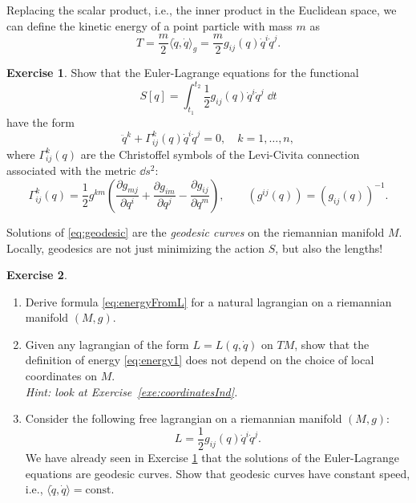 \documentclass[english,fontsize=11pt,paper=b5]{scrbook}
\theoremstyle{definition}
\newtheorem{exercise}{Exercise}[chapter]
\begin{document}
    Replacing the scalar product, i.e., the inner product in the Euclidean space, we can define the kinetic energy of a point particle with mass $m$ as
    \begin{equation}
      T = \frac m2 \langle\dot q, \dot q\rangle_g = \frac{m}2 g_{ij}(q)\dot q^i\dot q^j.
    \end{equation}

    \begin{exercise}\label{exe:geodesic1}
      Show that the Euler-Lagrange equations for the functional
      \begin{equation}
        S[q] = \int_{t_1}^{t_2} \frac 12 g_{ij}(q) \dot q^i \dot q^j\; \dd t
      \end{equation}
      have the form
      \begin{equation}\label{eq:geodesic}
        \ddot q^k + \Gamma_{ij}^k(q) \dot q^i \dot q^j = 0, \quad k=1,\ldots, n,
      \end{equation}
      where $\Gamma_{ij}^k(q)$ are the Christoffel symbols of the Levi-Civita connection associated with the metric $\dd s^2$:
      \begin{equation}
        \Gamma_{ij}^k(q) = \frac12 g^{km}\left(
          \frac{\partial g_{mj}}{\partial q^i} + \frac{\partial g_{im}}{\partial q^j}-\frac{\partial g_{ij}}{\partial q^m}
        \right),
        \qquad (g^{ij}(q)) = (g_{ij}(q))^{-1}.
      \end{equation}
    \end{exercise}

    Solutions of \eqref{eq:geodesic} are the \emph{geodesic curves} on the riemannian manifold $M$. Locally, geodesics are not just minimizing the action $S$, but also the lengths!

    \begin{exercise}
      \begin{enumerate}
        \item Derive formula \eqref{eq:energyFromL} for a natural lagrangian on a riemannian manifold $(M,g)$.
        \item Given any lagrangian of the form $L = L(q, \dot q)$ on $TM$, show that the definition of energy \eqref{eq:energy1} does not depend on the choice of local coordinates on $M$.\\\textit{Hint: look at Exercise~\ref{exe:coordinatesInd}.}
        \item Consider the following free lagrangian on a riemannian manifold $(M, g)$:
          \begin{equation}
            L = \frac12 g_{ij}(q)\dot q^i \dot q^j.
          \end{equation}
          We have already seen in Exercise \ref{exe:geodesic1} that the solutions of the Euler-Lagrange equations are geodesic curves.
          Show that geodesic curves have constant speed, i.e., $\langle\dot q, \dot q\rangle = \mathrm{const}$.
      \end{enumerate}
    \end{exercise}
\end{document}
